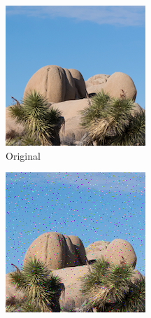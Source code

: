 \documentclass{article}
\begin{document}
\begin{figure}[htb]
    \centering
    \begin{subfigure}[b]{0.32\textwidth}
        \centering
        \includegraphics[width=\textwidth]{../Resource/cropped-image.png}
        \caption{Original}
        \label{fig:cropped-image-linear-bsc-original}
    \end{subfigure}
    \hfill
    \begin{subfigure}[b]{0.32\textwidth}
        \centering
        \includegraphics[width=\textwidth]{../Result/cropped-linear-bsc-output.png}

\end{subfigure}
\end{figure}
\end{document}
